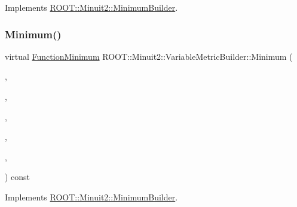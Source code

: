 Implements \mbox{\hyperlink{classROOT_1_1Minuit2_1_1MinimumBuilder_aefaa624436afa8195af1f3393a35981f}{R\+O\+O\+T\+::\+Minuit2\+::\+Minimum\+Builder}}.

\mbox{\label{classROOT_1_1Minuit2_1_1VariableMetricBuilder_af39ef2e38ec2bf3d94fa78fe0ed9a64a}} 
\subsubsection{\texorpdfstring{Minimum()}{Minimum()}\hspace{0.1cm}{\footnotesize\ttfamily [3/6]}}
{\footnotesize\ttfamily virtual \mbox{\hyperlink{classROOT_1_1Minuit2_1_1FunctionMinimum}{Function\+Minimum}} R\+O\+O\+T\+::\+Minuit2\+::\+Variable\+Metric\+Builder\+::\+Minimum (\begin{DoxyParamCaption}\item[{const \mbox{\hyperlink{classROOT_1_1Minuit2_1_1MnFcn}{Mn\+Fcn}} \&}]{,  }\item[{const \mbox{\hyperlink{classROOT_1_1Minuit2_1_1GradientCalculator}{Gradient\+Calculator}} \&}]{,  }\item[{const \mbox{\hyperlink{classROOT_1_1Minuit2_1_1MinimumSeed}{Minimum\+Seed}} \&}]{,  }\item[{const \mbox{\hyperlink{classROOT_1_1Minuit2_1_1MnStrategy}{Mn\+Strategy}} \&}]{,  }\item[{unsigned int}]{,  }\item[{double}]{ }\end{DoxyParamCaption}) const\hspace{0.3cm}{\ttfamily [virtual]}}



Implements \mbox{\hyperlink{classROOT_1_1Minuit2_1_1MinimumBuilder_aefaa624436afa8195af1f3393a35981f}{R\+O\+O\+T\+::\+Minuit2\+::\+Minimum\+Builder}}.

\mbox{\label{classROOT_1_1Minuit2_1_1VariableMetricBuilder_a6214271e1802f110e94725295f3900fc}} 
